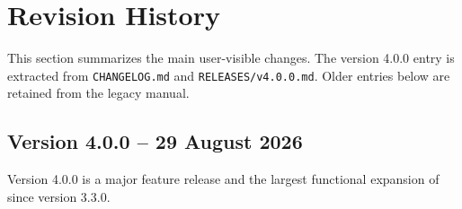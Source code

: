 \chapter*{Revision History}

This section summarizes the main user-visible changes.  The version 4.0.0
entry is extracted from \texttt{CHANGELOG.md} and
\texttt{RELEASES/v4.0.0.md}.  Older entries below are retained from the
legacy manual.

\section*{Version 4.0.0 -- 29 August 2026}

Version 4.0.0 is a major feature release and the largest functional expansion
of \ghats{} since version 3.3.0.

